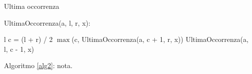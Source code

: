 \begin{algorithm}[H]
\caption{Ultima occorrenza}
\label{alg2}
\begin{algorithmic}[1]
\STATE UltimaOccorrenza(a, l, r, x):
\begin{ALC@g}
\ENDIF
{}
    \RETURN l
\ELSE
\ENDIF
\STATE c = (l + r) / 2
    \RETURN $\max$(c, UltimaOccorrenza(a, c + 1, r, x))
\ELSE
    \RETURN UltimaOccorrenza(a, l, c - 1, x)
\ENDIF
\end{ALC@g}
\end{algorithmic}
\end{algorithm}

Algoritmo \ref{alg2}:
nota\footnotemark{}.\\
\lipsum[2]

\newpage